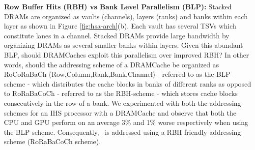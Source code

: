 \par \textbf{Row Buffer Hits (RBH) vs Bank Level Parallelism (BLP):} Stacked DRAMs are organized as vaults (channels), layers (ranks) and banks within each layer as shown in Figure \ref{fig:hsa-arch}(b). Each vault has several TSVs which constitute lanes in a channel. Stacked DRAMs provide large bandwidth by organizing DRAMs as several smaller banks within layers. Given this abundant BLP, should DRAMCaches exploit this parallelism over improved RBH? In other words, should the addressing scheme of a DRAMCache be organized as RoCoRaBaCh (Row,Column,Rank,Bank,Channel) - referred to as the BLP-scheme - which distributes the cache blocks in banks of different ranks as opposed to RoRaBaCoCh - referred to as the RBH-scheme - which stores cache blocks consecutively in the row of a bank. We experimented with both the addressing schemes for an IHS processor with a DRAMCache and observe that both the CPU and GPU perform on an average 3\% and 1\% worse respectively when using the BLP scheme. Consequently, \cachename\ is addressed using a RBH friendly addressing scheme (RoRaBaCoCh scheme). 


